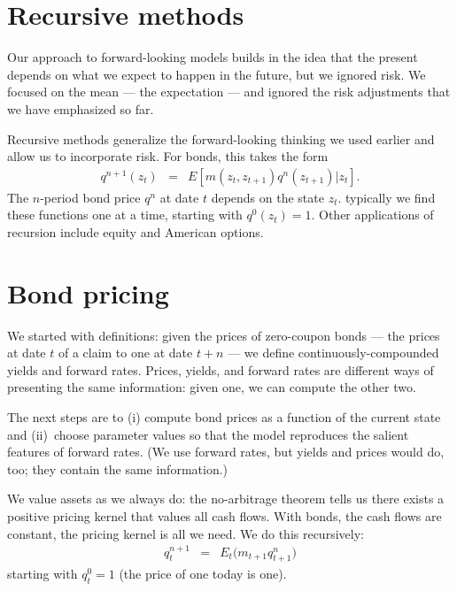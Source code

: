 \documentclass[11pt]{article}
\begin{document}
\section{Recursive methods}

Our approach to forward-looking models builds in the idea that 
the present depends on what we expect to happen in the future, 
but we ignored risk.  
We focused on the mean --- the expectation --- and ignored 
the risk adjustments that we have emphasized so far.  

Recursive methods generalize the forward-looking thinking we used earlier
and allow us to incorporate risk.  
For bonds, this takes the form 
\begin{eqnarray*}
    q^{n+1}(z_t) &=&  E \left[ m(z_t,z_{t+1}) q^n(z_{t+1}) | z_t \right] .
\end{eqnarray*}
The $n$-period bond price $q^n$ at date $t$ depends on the state $z_t$.  
typically we find these functions one at a time, starting with $q^0(z_t) = 1$. 
Other applications of recursion include equity and American options.  


\section{Bond pricing}

We started with definitions:  given the prices of zero-coupon bonds ---
the prices at date $t$ of a claim to one at date $t+n$ --- 
we define continuously-compounded yields and forward rates.
Prices, yields, and forward rates are different ways of presenting
the same information:  given one, we can compute the other two.

The next steps are to (i) compute bond prices as a function of the current state
and (ii)~choose parameter values so that the model reproduces
the salient features of forward rates.  
(We use forward rates, but yields and prices would do, too;
they contain the same information.) 

We value assets as we always do:  the no-arbitrage theorem
tells us there exists a positive pricing kernel that values all cash flows.
With bonds, the cash flows are constant, the pricing kernel
is all we need.
We do this recursively:
\begin{eqnarray*}
    q^{n+1}_t &=& E_t \big( m_{t+1} q^n_{t+1} \big)
\end{eqnarray*}
starting with $q^0_t = 1$ (the price of one today is one).
\end{document}

